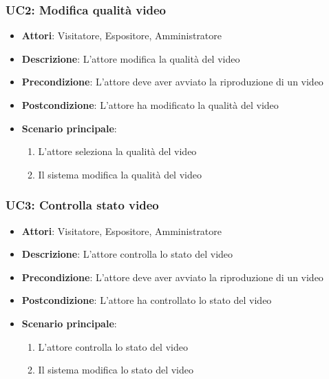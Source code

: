 \subsubsection{UC2: Modifica qualità video}
\label{subsubsec:uc2}
\begin{itemize}
    \item \textbf{Attori}: Visitatore, Espositore, Amministratore
    \item \textbf{Descrizione}: L'attore modifica la qualità del video
    \item \textbf{Precondizione}: L'attore deve aver avviato la riproduzione di un video
    \item \textbf{Postcondizione}: L'attore ha modificato la qualità del video
    \item \textbf{Scenario principale}:
    \begin{enumerate}
        \item L'attore seleziona la qualità del video
        \item Il sistema modifica la qualità del video
    \end{enumerate}
\end{itemize}

\subsubsection{UC3: Controlla stato video}
\label{subsubsec:uc3}
\begin{itemize}
    \item \textbf{Attori}: Visitatore, Espositore, Amministratore
    \item \textbf{Descrizione}: L'attore controlla lo stato del video
    \item \textbf{Precondizione}: L'attore deve aver avviato la riproduzione di un video
    \item \textbf{Postcondizione}: L'attore ha controllato lo stato del video
    \item \textbf{Scenario principale}:
    \begin{enumerate}
        \item L'attore controlla lo stato del video
        \item Il sistema modifica lo stato del video
    \end{enumerate}
\end{itemize}

